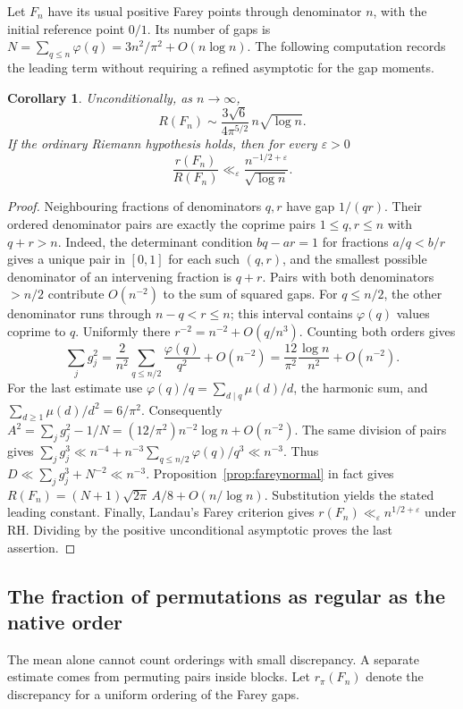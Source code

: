 \documentclass[11pt,a4paper]{article}
\newtheorem{corollary}[theorem]{Corollary}
\begin{document}
Let $F_n$ have its usual positive Farey points through denominator
$n$, with the initial reference point $0/1$. Its number of gaps is
$N=\sum_{q\le n}\varphi(q)=3n^2/\pi^2+O(n\log n)$.
The following computation records the leading term without requiring
a refined asymptotic for the gap moments.
\begin{corollary}
\label{cor:fareyasymp}
Unconditionally, as $n\to\infty$,
\[
 R(F_n)\sim\frac{3\sqrt6}{4\pi^{5/2}}\,n\sqrt{\log n}.
\]
If the ordinary Riemann hypothesis holds, then for every $\varepsilon>0$
\[
 \frac{r(F_n)}{R(F_n)}
  \ll_{\varepsilon}\frac{n^{-1/2+\varepsilon}}{\sqrt{\log n}}.
\]
\end{corollary}
\begin{proof}
Neighbouring fractions of denominators $q,r$ have gap $1/(qr)$.
Their ordered denominator pairs are exactly the coprime pairs
$1\le q,r\le n$ with $q+r>n$. Indeed, the determinant condition
$bq-ar=1$ for fractions $a/q<b/r$ gives a unique pair in $[0,1]$
for each such $(q,r)$, and the smallest possible denominator of
an intervening fraction is $q+r$. Pairs with both denominators $>n/2$
contribute $O(n^{-2})$ to the sum of squared gaps. For $q\le n/2$,
the other denominator runs through $n-q<r\le n$; this interval
contains $\varphi(q)$ values coprime to $q$. Uniformly there
$r^{-2}=n^{-2}+O(q/n^3)$. Counting both orders gives
\[
 \sum_j g_j^2=\frac2{n^2}\sum_{q\le n/2}\frac{\varphi(q)}{q^2}
       + O(n^{-2})
 =\frac{12}{\pi^2}\frac{\log n}{n^2}+O(n^{-2}).
\]
For the last estimate use $\varphi(q)/q=\sum_{d\mid q}\mu(d)/d$,
the harmonic sum, and $\sum_{d\ge1}\mu(d)/d^2=6/\pi^2$.
Consequently $A^2=\sum_jg_j^2-1/N
=(12/\pi^2)n^{-2}\log n+O(n^{-2})$.
The same division of pairs gives
$\sum_jg_j^3\ll n^{-4}+n^{-3}\sum_{q\le n/2}\varphi(q)/q^3
\ll n^{-3}$. Thus $D\ll \sum_j g_j^3+N^{-2}\ll n^{-3}$.
Proposition~\ref{prop:fareynormal} in fact gives
$R(F_n)=(N+1)\sqrt{2\pi}\,A/8+O(n/\log n)$.
Substitution yields the stated leading constant. Finally, Landau's
Farey criterion \cite{landau1924} gives
$r(F_n)\ll_\varepsilon n^{1/2+\varepsilon}$ under RH. Dividing by the
positive unconditional asymptotic proves the last assertion.
\end{proof}

\subsection{The fraction of permutations as regular as the native order}
The mean alone cannot count orderings with small discrepancy. A separate
estimate comes from permuting pairs inside blocks. Let $r_\pi(F_n)$
denote the discrepancy for a uniform ordering of the Farey gaps.
\end{document}
